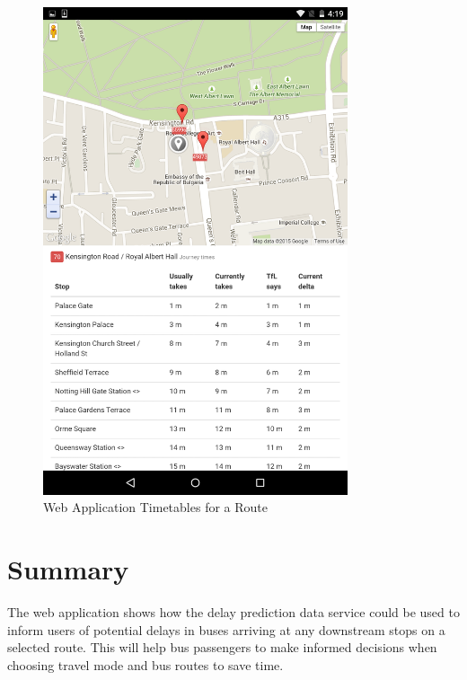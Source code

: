 \begin{figure}
\centering
\includegraphics[width=0.8\textwidth]{figures/timetables.png}
\caption{\label{fig:timetable_view} Web Application Timetables for a Route}
\end{figure}

\section{Summary}
\par The web application shows how the delay prediction data service could be used to inform users of potential delays in buses arriving at any downstream stops on a selected route. This will help bus passengers to make informed decisions when choosing travel mode and bus routes to save time.


